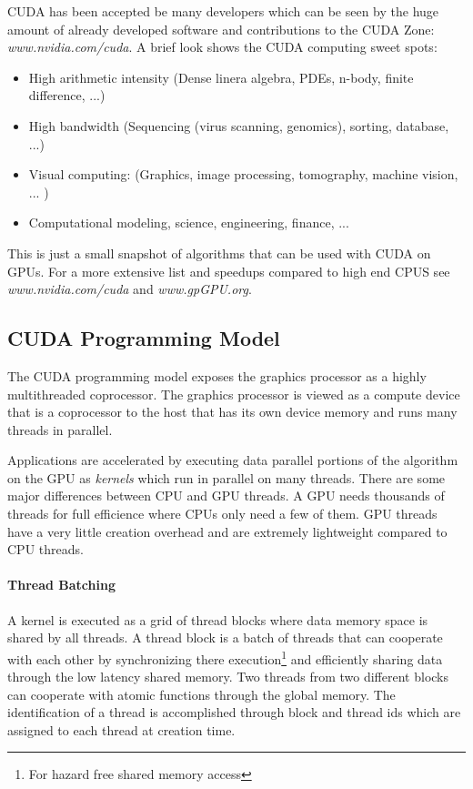 CUDA has been accepted be many developers which can be seen by the huge amount
of already developed software and contributions to the CUDA Zone:
\emph{www.nvidia.com/cuda}. A brief look shows the CUDA computing sweet 
spots\cite{citeulike:3839013}: 
\begin{itemize} 
	\item High arithmetic intensity (Dense linera algebra, PDEs, n-body, 
			finite difference, ...) 
	\item High bandwidth (Sequencing (virus scanning, genomics), sorting, 			
			database, ...) 
	\item Visual computing: (Graphics, image processing, tomography, 
			machine vision, ... ) 
	\item Computational modeling, science, engineering, finance, ... 			
\end{itemize}

This is just a small snapshot of algorithms that can be used with CUDA on GPUs.
For a more extensive list and speedups compared to high end CPUS see 
\emph{www.nvidia.com/cuda} and \emph{www.gpGPU.org}.

\subsection*{CUDA Programming Model} %
\label{sub:cuda_programming_model}
The CUDA programming model exposes the graphics processor as a highly
multithreaded coprocessor. The graphics processor is viewed as a compute device
that is a coprocessor to the host that has its own device memory and runs many
threads in parallel.

Applications are accelerated by executing data parallel portions of the
algorithm on the \gls{GPU} as \emph{kernels} which run in parallel on
many threads. There are some major differences between CPU and \gls{GPU} threads. 
A \gls{GPU} needs thousands of threads for full efficience where CPUs only need a few of
them. \gls{GPU} threads have a very little creation overhead and are extremely
lightweight compared to CPU threads.

\paragraph{Thread Batching} %
\label{par:thread_batching}
A kernel is executed as a grid of thread blocks where data memory space is
shared by all threads. A thread block is a batch of threads that can cooperate
with each other by synchronizing there execution\footnote{For hazard free shared
memory access} and efficiently sharing data through the low latency shared
memory. Two threads from two different blocks can cooperate with atomic 
functions through the global memory. The identification of a thread is 
accomplished through block and thread ids which are assigned to each thread at 
creation time. 

